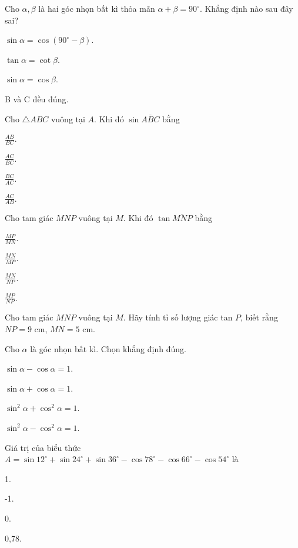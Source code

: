 \documentclass[%
    fontsize=12pt,%
    chapterprefix=false,%
    open=right,%
    twoside=false,%
    numbers=noenddot,%
    headings=optiontohead,%
    final,%
    DIV=15,%
    parskip=half %
]{scrbook}
\begin{document}
\begin{tracnghiem}

\item Cho $ \alpha, \beta $ là hai góc nhọn bất kì thỏa mãn $ \alpha + \beta = 90^\circ $. Khẳng định nào sau đây sai?
\begin{options}
  \item $ \sin \alpha = \cos(90^\circ - \beta) $.
  \item $ \tan \alpha = \cot \beta $.
  \item $ \sin \alpha = \cos \beta $.
  \item B và C đều đúng.
\end{options}

\item Cho $ \triangle ABC $ vuông tại $ A $. Khi đó $ \sin \overline{ABC} $ bằng
\begin{options}
  \item $ \frac{AB}{BC} $.
  \item $ \frac{AC}{BC} $.
  \item $ \frac{BC}{AC} $.
  \item $ \frac{AC}{AB} $.
\end{options}

\item Cho tam giác $ MNP $ vuông tại $ M $. Khi đó $ \tan \overline{MNP} $ bằng
\begin{options}
  \item $ \frac{MP}{MN} $.
  \item $ \frac{MN}{MP} $.
  \item $ \frac{MN}{NP} $.
  \item $ \frac{MP}{NP} $.
\end{options}

\item Cho tam giác $ MNP $ vuông tại $ M $. Hãy tính tỉ số lượng giác tan $ P $, biết rằng $ NP = 9 $ cm, $ MN = 5 $ cm.

\item Cho $ \alpha $ là góc nhọn bất kì. Chọn khẳng định đúng.
\begin{options}
  \item $ \sin \alpha - \cos \alpha = 1 $.
  \item $ \sin \alpha + \cos \alpha = 1 $.
  \item $ \sin^2 \alpha + \cos^2 \alpha = 1 $.
  \item $ \sin^2 \alpha - \cos^2 \alpha = 1 $.
\end{options}

\item Giá trị của biểu thức $ A = \sin 12^\circ + \sin 24^\circ + \sin 36^\circ - \cos 78^\circ - \cos 66^\circ - \cos 54^\circ $ là
\begin{options}
  \item 1.
  \item -1.
  \item 0.
  \item 0,78.
\end{options}


\end{tracnghiem}
\end{document}
